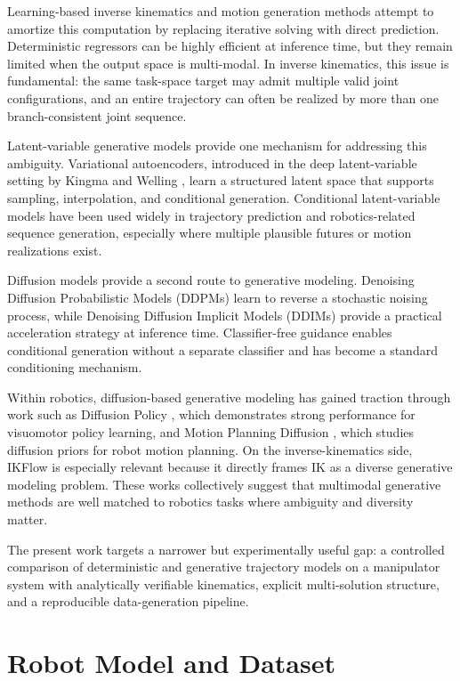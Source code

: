\documentclass[11pt]{article}
\begin{document}
Learning-based inverse kinematics and motion generation methods attempt to amortize this computation by replacing iterative solving with direct prediction. Deterministic regressors can be highly efficient at inference time, but they remain limited when the output space is multi-modal. In inverse kinematics, this issue is fundamental: the same task-space target may admit multiple valid joint configurations, and an entire trajectory can often be realized by more than one branch-consistent joint sequence.

Latent-variable generative models provide one mechanism for addressing this ambiguity. Variational autoencoders, introduced in the deep latent-variable setting by Kingma and Welling \cite{kingma2013vae}, learn a structured latent space that supports sampling, interpolation, and conditional generation. Conditional latent-variable models have been used widely in trajectory prediction and robotics-related sequence generation, especially where multiple plausible futures or motion realizations exist.

Diffusion models provide a second route to generative modeling. Denoising Diffusion Probabilistic Models (DDPMs) \cite{ho2020ddpm} learn to reverse a stochastic noising process, while Denoising Diffusion Implicit Models (DDIMs) \cite{song2020ddim} provide a practical acceleration strategy at inference time. Classifier-free guidance \cite{ho2022cfg} enables conditional generation without a separate classifier and has become a standard conditioning mechanism.

Within robotics, diffusion-based generative modeling has gained traction through work such as Diffusion Policy \cite{chi2023diffusionpolicy}, which demonstrates strong performance for visuomotor policy learning, and Motion Planning Diffusion \cite{carvalho2023mpd}, which studies diffusion priors for robot motion planning. On the inverse-kinematics side, IKFlow \cite{ames2021ikflow} is especially relevant because it directly frames IK as a diverse generative modeling problem. These works collectively suggest that multimodal generative methods are well matched to robotics tasks where ambiguity and diversity matter.

The present work targets a narrower but experimentally useful gap: a controlled comparison of deterministic and generative trajectory models on a manipulator system with analytically verifiable kinematics, explicit multi-solution structure, and a reproducible data-generation pipeline.

\section{Robot Model and Dataset}
\end{document}
